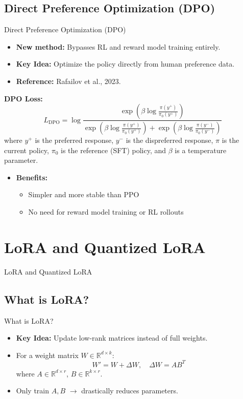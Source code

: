 \subsection{Direct Preference Optimization (DPO)}
\begin{frame}{Direct Preference Optimization (DPO)}
    \begin{itemize}
        \item \textbf{New method:} Bypasses RL and reward model training entirely.
        \item \textbf{Key Idea:} Optimize the policy directly from human preference data.
        \item \textbf{Reference:} Rafailov et al., 2023.
    \end{itemize}
    \vspace{0.5em}
    \textbf{DPO Loss:}
    \[
        L_{\mathrm{DPO}} = \log \frac{
            \exp\left(\beta \log \frac{\pi(y^+)}{\pi_0(y^+)}\right)
        }{
            \exp\left(\beta \log \frac{\pi(y^+)}{\pi_0(y^+)}\right) +
            \exp\left(\beta \log \frac{\pi(y^-)}{\pi_0(y^-)}\right)
        }
    \]
    where $y^+$ is the preferred response, $y^-$ is the dispreferred response, $\pi$ is the current policy, $\pi_0$ is the reference (SFT) policy, and $\beta$ is a temperature parameter.
    \begin{itemize}
        \item \textbf{Benefits:}
        \begin{itemize}
            \item Simpler and more stable than PPO
            \item No need for reward model training or RL rollouts
        \end{itemize}
    \end{itemize}
\end{frame}



\section{LoRA and Quantized LoRA}
\begin{frame}{}
    \LARGE LoRA and Quantized LoRA
\end{frame}

\subsection{What is LoRA?}
\begin{frame}{What is LoRA?}
    \begin{itemize}
        \item \textbf{Key Idea:} Update low-rank matrices instead of full weights.
        \item For a weight matrix $W \in \mathbb{R}^{d \times k}$:
        \[
            W' = W + \Delta W, \quad \Delta W = AB^T
        \]
        where $A \in \mathbb{R}^{d \times r}$, $B \in \mathbb{R}^{k \times r}$.
        \item Only train $A, B$ $\rightarrow$ drastically reduces parameters.
    \end{itemize}
\end{frame}


